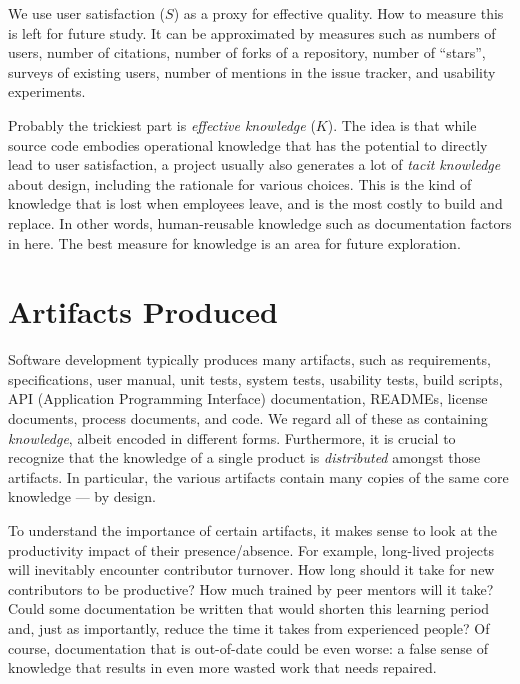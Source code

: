 \documentclass[sigconf, authorversion, nonacm]{acmart}
\begin{document}
We use user satisfaction ($S$) as a proxy for effective quality. How to 
measure this is left for future study. It can be approximated by measures
such as numbers of users, number of citations, number
of forks of a repository, number of ``stars'', surveys of existing users,
number of mentions in the issue tracker, and usability experiments.

Probably the trickiest part is \emph{effective knowledge} ($K$). The idea
is that while source code embodies operational knowledge that has the
potential to directly lead to user satisfaction, a project usually also
generates a lot of \emph{tacit knowledge} about design, including the
rationale for various choices. This is the kind of knowledge that is lost
when employees leave, and is the most costly to build and replace.
In other words, human-reusable knowledge such as documentation factors in
here.  The best measure for knowledge is an area for future exploration.

\section{Artifacts Produced}

Software development typically produces many artifacts, such as
requirements, specifications, user manual, unit
tests, system tests, usability tests, build scripts, API (Application
Programming Interface) documentation, READMEs, license documents, process
documents, and code. We regard all of these as containing
\emph{knowledge}, albeit encoded in different forms. Furthermore, it is
crucial to recognize that the knowledge of a single product is 
\emph{distributed} amongst those artifacts. In particular, the various
artifacts contain many copies of the same core knowledge --- by design.

To understand the importance of certain artifacts, it makes sense to look
at the productivity impact of their presence/absence. For example,
long-lived projects will inevitably encounter contributor turnover. How long
should it take for new contributors to be productive? How much trained by
peer mentors will it take? Could some documentation be written that would
shorten this learning period and, just as importantly, reduce the time it
takes from experienced people? Of course, documentation that is out-of-date
could be even worse: a false sense of knowledge that results in even more
wasted work that needs repaired.
\end{document}
